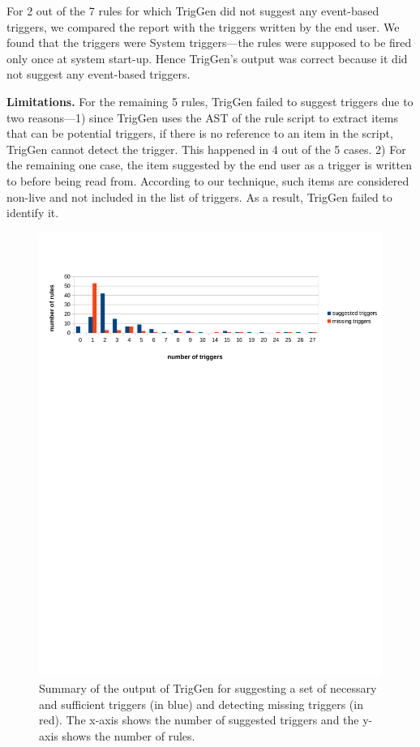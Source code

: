 \documentclass{sig-alternate-05-2015}
\begin{document}
For 2 out of the 7 rules for which TrigGen did not suggest any event-based triggers, we compared the report with the triggers written by the end user. We found that the triggers were System triggers---the rules were supposed to be fired only once at system start-up. Hence TrigGen's output was correct because it did not suggest any event-based triggers. 

\textbf{Limitations.}
For the remaining 5 rules, TrigGen failed to suggest triggers due to two reasons---1) since TrigGen uses the AST of the rule script to extract items that can be potential triggers, if there is no reference to an item in the script, TrigGen cannot detect the trigger. This happened in 4 out of the 5 cases. 2) For the remaining one case, the item suggested by the end user as a trigger is written to before being read from. According to our technique, such items are considered non-live and not included in the list of triggers. As a result, TrigGen failed to identify it.

\begin{figure}[t]
\centering
\includegraphics [trim=0 550 50 70, scale=0.9]{images/plot.pdf}
\caption{Summary of the output of TrigGen for suggesting a set of necessary and sufficient triggers (in blue) and detecting missing triggers (in red). The x-axis shows the number of suggested triggers and the y-axis shows the number of rules.}
\label{fig:resultgraph}
\end{figure} 
\end{document}
